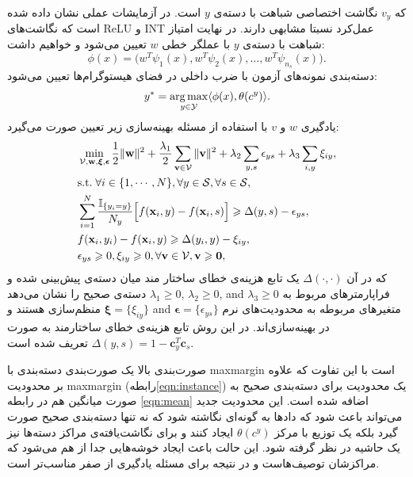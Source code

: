 که $v_y$ نگاشت اختصاصی شباهت با دسته‌ی $y$ است. در آزمایشات عملی نشان داده شده است که نگاشت‌های ReLU و INT عمل‌کرد نسبتا مشابهی دارند. در نهایت امتیاز شباهت با دسته‌ی $y$ با عملگر خطی $w$ تعیین می‌شود و خواهیم داشت:
\begin{equation}
    \phi(x) = \big (w^T\psi_1(x), w^T\psi_2(x), \ldots, w^T\psi_{n_s}(x) \big ).
\end{equation}	
دسته‌بندی نمونه‌های آزمون با ضرب داخلی  در فضای هیستوگرام‌ها تعیین می‌شود:
\begin{equation}
y^* = \argmax_{y \in \mathcal{Y}} \langle \phi(x), \theta(c^y) \rangle.
\end{equation}
یادگیری $w$ و $v$ با استفاده از مسئله بهینه‌سازی زیر تعیین صورت می‌گیرد:
\begin{align}\label{eqn:sl}
&\min_{\mathcal{V}, \mathbf{w}, \boldsymbol{\xi}, \boldsymbol{\epsilon}}\frac{1}{2}\|\mathbf{w}\|^2+\frac{\lambda_1}{2}\sum_{\mathbf{v}\in\mathcal{V}}\|\mathbf{v}\|^2+\lambda_2\sum_{y,s}\epsilon_{ys}+\lambda_3\sum_{i,y}\xi_{iy},\\
&\mbox{s.t.} \; \forall i\in\{1,\cdots,N\}, \forall y\in\mathcal{S}, \forall s\in\mathcal{S}, \nonumber\\
&\sum_{i=1}^N {\mathbb{I}_{\{y_i=y\}} \over N_y}\Big[f(\mathbf{x}_i,y)-f(\mathbf{x}_i,s)\Big]\geq\Delta(y,s)-\epsilon_{ys}, \label{eqn:mean}\\
&  f(\mathbf{x}_i,y_i)-f(\mathbf{x}_i,y)\geq\Delta(y_i,y)-\xi_{iy}, \label{eqn:instance}\\
& \epsilon_{ys}\geq0, \xi_{iy}\geq0, \forall \mathbf{v}\in\mathcal{V}, \mathbf{v}\geq\mathbf{0},\nonumber
\end{align}
%
که در آن 
$\Delta(\cdot, \cdot)$
یک تابع هزینه‌ی خطای ساختار مند میان دسته‌ی پیش‌بینی شده و دسته‌ی صحیح را نشان می‌دهد 
  $\lambda_1\geq0$, $\lambda_2\geq0$, and $\lambda_3\geq0$
فراپارمترهای مربوط به منظم‌سازی هستند و 
   $\boldsymbol{\xi}=\{\xi_{iy}\}$ and $\boldsymbol{\epsilon}=\{\epsilon_{ys}\}$ 
متغیرهای مربوطه به محدودیت‌های نرم در بهینه‌سازی‌اند.
     در این روش تابع هزینه‌ی خطای ساختارمند  به صورت 
 $\Delta(y,s)=1-\mathbf{c}_{y}^T\mathbf{c}_{s}$
 تعریف شده است.
 
صورت‌بندی بالا یک صورت‌بندی دسته‌بندی با \gls{maxmargin} است با این تفاوت که علاوه بر محدودیت \gls{maxmargin} (رابطه\eqref{eqn:instance}) یک محدودیت برای دسته‌بندی صحیح به صورت میانگین هم در رابطه 
\eqref{eqn:mean}
اضافه شده است. این محدودیت جدید می‌تواند باعث شود که داد‌ها به گونه‌ای نگاشته شود که نه تنها دسته‌بندی صحیح صورت گیرد بلکه  یک توزیع با مرکز $\theta(c^y)$ ایجاد کنند و برای نگاشت‌یافته‌ی مراکز دسته‌ها نیز یک حاشیه در نظر گرفته شود. این حالت باعث ایجاد خوشه‌هایی جدا از هم می‌شود که مراکزشان توصیف‌هاست و در نتیجه برای مسئله یادگیری از صفر مناسب‌تر است.

